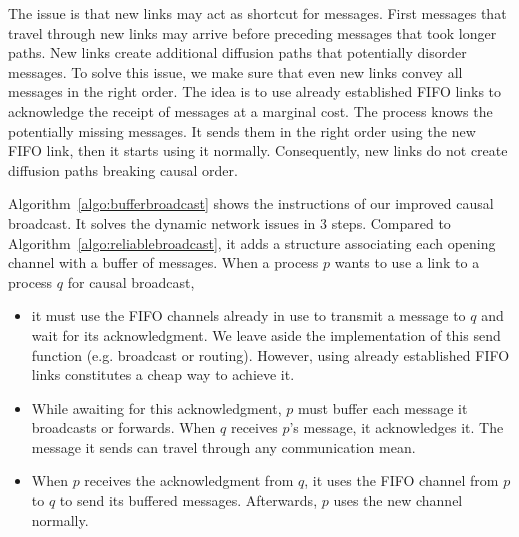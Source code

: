 The issue is that new links may act as shortcut for messages. First messages
that travel through new links may arrive before preceding messages that took
longer paths. New links create additional diffusion paths that potentially
disorder messages. To solve this issue, we make sure that even new links convey
all messages in the right order. The idea is to use already established FIFO
links to acknowledge the receipt of messages at a marginal cost. The process
knows the potentially missing messages. It sends them in the right order using
the new FIFO link, then it starts using it normally. Consequently, new links
do not create diffusion paths breaking causal order.




Algorithm~\ref{algo:bufferbroadcast} shows the instructions of our improved
causal broadcast. It solves the dynamic network issues in 3 steps.  Compared to
Algorithm~\ref{algo:reliablebroadcast}, it adds a structure associating each
opening channel with a buffer of messages.  When a process $p$ wants to use a
link to a process $q$ for causal broadcast,
\begin{itemize}[(i)]
\item it must use the FIFO channels already in use to transmit a message to $q$
  and wait for its acknowledgment. We leave aside the implementation of this
  send function (e.g. broadcast or routing). However, using already established
  FIFO links constitutes a cheap way to achieve it.
\item While awaiting for this acknowledgment, $p$ must buffer each message it
  broadcasts or forwards. When $q$ receives $p$'s message, it acknowledges
  it. The message it sends can travel through any communication mean.
\item When $p$ receives the acknowledgment from $q$, it uses the FIFO channel
  from $p$ to $q$ to send its buffered messages. Afterwards, $p$ uses the new
  channel normally.
\end{itemize}

